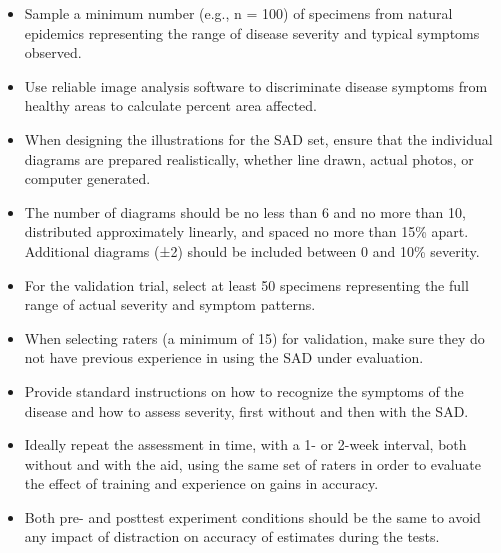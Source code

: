 \documentclass[
  letterpaper,
]{book}
\begin{document}
\begin{tcolorbox}[enhanced jigsaw, titlerule=0mm, rightrule=.15mm, colbacktitle=quarto-callout-tip-color!10!white, opacitybacktitle=0.6, toptitle=1mm, leftrule=.75mm, colback=white, colframe=quarto-callout-tip-color-frame, bottomrule=.15mm, toprule=.15mm, breakable, bottomtitle=1mm, coltitle=black, title=\textcolor{quarto-callout-tip-color}{\faLightbulb}\hspace{0.5em}{Best practices on SADs development}, arc=.35mm, opacityback=0, left=2mm]

\begin{itemize}
\item
  Sample a minimum number (e.g., n = 100) of specimens from natural
  epidemics representing the range of disease severity and typical
  symptoms observed.
\item
  Use reliable image analysis software to discriminate disease symptoms
  from healthy areas to calculate percent area affected.
\item
  When designing the illustrations for the SAD set, ensure that the
  individual diagrams are prepared realistically, whether line drawn,
  actual photos, or computer generated.
\item
  The number of diagrams should be no less than 6 and no more than 10,
  distributed approximately linearly, and spaced no more than 15\%
  apart. Additional diagrams (±2) should be included between 0 and 10\%
  severity.
\item
  For the validation trial, select at least 50 specimens representing
  the full range of actual severity and symptom patterns.
\item
  When selecting raters (a minimum of 15) for validation, make sure they
  do not have previous experience in using the SAD under evaluation.
\item
  Provide standard instructions on how to recognize the symptoms of the
  disease and how to assess severity, first without and then with the
  SAD.
\item
  Ideally repeat the assessment in time, with a 1- or 2-week interval,
  both without and with the aid, using the same set of raters in order
  to evaluate the effect of training and experience on gains in
  accuracy.
\item
  Both pre- and posttest experiment conditions should be the same to
  avoid any impact of distraction on accuracy of estimates during the
  tests.
\end{itemize}

\end{tcolorbox}
\end{document}
